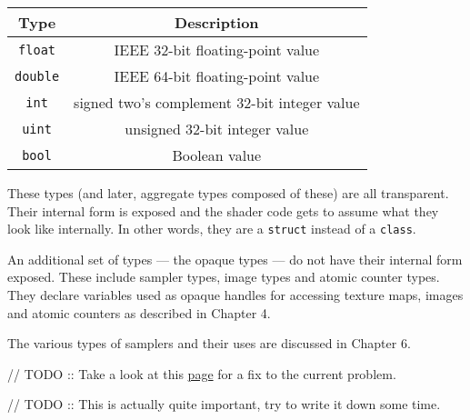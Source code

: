 \documentclass[a4paper, 12pt]{article}
\newcounter{subsubsubsection}[subsubsection]
\begin{document}
\begin{minipage}{\textwidth}
\centering
{}
\begin{tabular}{ c c }\toprule[1.5pt]
\bf Type & \bf Description\\\midrule
\verb|float| & IEEE 32-bit floating-point value \\
\verb|double| & IEEE 64-bit floating-point value \\
\verb|int| & signed two's complement 32-bit integer value \\
\verb|uint| & unsigned 32-bit integer value \\
\verb|bool| & Boolean value \\
\bottomrule[1.25pt]
\end {tabular}\par
\bigskip

\end{minipage}

These types (and later, aggregate types composed of these) are all transparent.
Their internal form is exposed and the shader code gets to assume what they look like internally.
In other words, they are a \verb|struct| instead of a \verb|class|.

An additional set of types --- the opaque types --- do not have their internal form exposed.
These include sampler types, image types and atomic counter types.
They declare variables used as opaque handles for accessing texture maps, images and atomic counters as described in Chapter 4.

The various types of samplers and their uses are discussed in Chapter 6.

// TODO :: Take a look at this \href{https://tex.stackexchange.com/questions/60209/how-to-add-an-extra-level-of-sections-with-headings-below-subsubsection}{page} for a fix to the current problem.









// TODO :: This is actually quite important, try to write it down some time.
\end{document}
